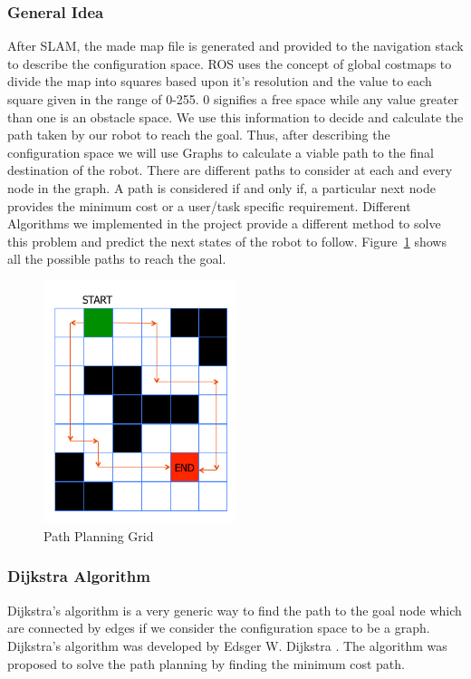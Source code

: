 \subsubsection{General Idea}
After SLAM, the made map file is generated and provided to the navigation stack to describe the configuration space.
ROS uses the concept of global costmaps to divide the map into squares based upon it's resolution and the value to each square given in the range of 0-255.
0 signifies a free space while any value greater than one is an obstacle space. We use this information to decide and calculate the path taken by our robot to reach the goal.
Thus, after describing the configuration space we will use Graphs to calculate a viable path to the final destination of the robot.
There are different paths to consider at each and every node in the graph. A path is considered if and only if, a particular next node provides the minimum cost or a user/task specific requirement.
Different Algorithms we implemented in the project provide a different method to solve this problem and predict the next states of the robot to follow.
Figure~\ref{fig:PPGrid} shows all the possible paths to reach the goal.
\begin{figure}[th]
    \centering
    \includegraphics[width=0.5\textwidth]{Figures/grid-path-planning.png}
    \decoRule
    \caption[]{Path Planning Grid}
    \label{fig:PPGrid}
\end{figure}

\subsubsection{Dijkstra Algorithm}
Dijkstra's algorithm is a very generic way to find the path to the goal node which are connected by edges if we consider the configuration space to be a graph. Dijkstra's algorithm was developed by Edsger W. Dijkstra \cite{enwiki:1039157161}. The algorithm
was proposed to solve the path planning by finding the minimum cost path.
